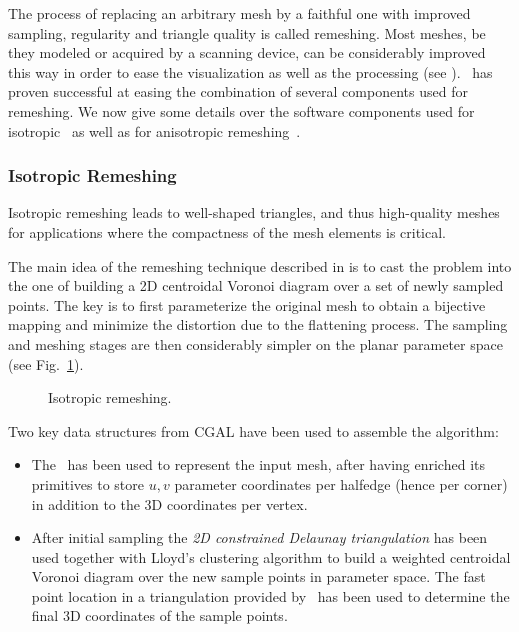 \label{sec:remeshing}


The process of replacing an arbitrary mesh by a faithful one with
improved sampling, regularity and triangle quality is called
remeshing. Most meshes, be they modeled or acquired by a scanning
device, can  be considerably improved this way in order to ease the
visualization as well as the processing (see \cite{ss-dgp-01}). \cgal\
has proven successful at easing the combination of several components
used for remeshing. We now give some details over the software
components used for isotropic~\cite{acdi-isr-03} as well as for
anisotropic remeshing~\cite{acdld-apr-03}.

\subsubsection{Isotropic Remeshing}


Isotropic remeshing leads to well-shaped triangles, and thus
high-quality meshes for applications where the compactness of the mesh
elements is critical.


The main idea of the remeshing technique described in
\cite{acdi-isr-03} is to cast the problem into the
one of building a 2D centroidal Voronoi diagram over a set of newly
sampled points. The key is to first parameterize the original mesh to
obtain a bijective mapping and minimize the distortion due to the
flattening process. The sampling and meshing stages are then
considerably simpler on the planar parameter space (see
Fig.~\ref{fig:isotropic}).

\begin{figure}
  \centering
  \caption{Isotropic remeshing.}
  \label{fig:isotropic}
\end{figure}



Two key data structures from CGAL have been used to assemble the
algorithm:

\begin{itemize}

\item 
The \cgalpoly\ has been used to represent the input mesh, after
having enriched its primitives to store $u,v$ parameter coordinates
per halfedge (hence per corner) in addition to the 3D coordinates per
vertex.

\item 
After initial sampling the \emph{2D constrained Delaunay
triangulation} has been used together with Lloyd's clustering
algorithm to build a weighted centroidal Voronoi diagram over the new
sample points in parameter space. The fast point location in a
triangulation provided by \cgal\ has been used to determine the final 3D
coordinates of the sample points.

\end{itemize}

